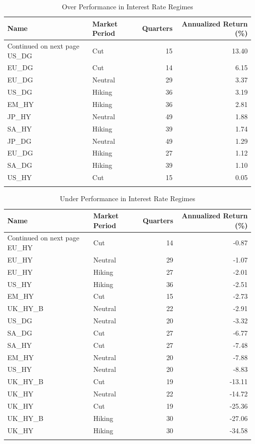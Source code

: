 \documentclass[11pt,preprint, authoryear]{elsarticle}
\numberwithin{equation}{section}
\numberwithin{figure}{section}
\numberwithin{table}{section}
\begin{document}
\begin{longtable}{llrr}
  \toprule
Name & Market Period & Quarters & Annualized Return (\%) \\ 
  \hline 
\endhead 
\hline 
{\footnotesize Continued on next page} 
\endfoot 
\endlastfoot 
 \midrule
US\_DG & Cut &  15 & 13.40 \\ 
  EU\_DG & Cut &  14 & 6.15 \\ 
  EU\_DG & Neutral &  29 & 3.37 \\ 
  US\_DG & Hiking &  36 & 3.19 \\ 
  EM\_HY & Hiking &  36 & 2.81 \\ 
  JP\_HY & Neutral &  49 & 1.88 \\ 
  SA\_HY & Hiking &  39 & 1.74 \\ 
  JP\_DG & Neutral &  49 & 1.29 \\ 
  EU\_DG & Hiking &  27 & 1.12 \\ 
  SA\_DG & Hiking &  39 & 1.10 \\ 
  US\_HY & Cut &  15 & 0.05 \\ 
   \bottomrule
\caption{Over Performance in Interest Rate Regimes\label{tab4}} 
\end{longtable}
\endgroup
\begingroup\fontsize{12pt}{13pt}\selectfont
\begin{longtable}{llrr}
  \toprule
Name & Market Period & Quarters & Annualized Return (\%) \\ 
  \hline 
\endhead 
\hline 
{\footnotesize Continued on next page} 
\endfoot 
\endlastfoot 
 \midrule
EU\_HY & Cut &  14 & -0.87 \\ 
  EU\_HY & Neutral &  29 & -1.07 \\ 
  EU\_HY & Hiking &  27 & -2.01 \\ 
  US\_HY & Hiking &  36 & -2.51 \\ 
  EM\_HY & Cut &  15 & -2.73 \\ 
  UK\_HY\_B & Neutral &  22 & -2.91 \\ 
  US\_DG & Neutral &  20 & -3.32 \\ 
  SA\_DG & Cut &  27 & -6.77 \\ 
  SA\_HY & Cut &  27 & -7.48 \\ 
  EM\_HY & Neutral &  20 & -7.88 \\ 
  US\_HY & Neutral &  20 & -8.83 \\ 
  UK\_HY\_B & Cut &  19 & -13.11 \\ 
  UK\_HY & Neutral &  22 & -14.72 \\ 
  UK\_HY & Cut &  19 & -25.36 \\ 
  UK\_HY\_B & Hiking &  30 & -27.06 \\ 
  UK\_HY & Hiking &  30 & -34.58 \\ 
   \bottomrule
\caption{Under Performance in Interest Rate Regimes\label{tab5}} 
\end{longtable}
\endgroup
\end{document}
